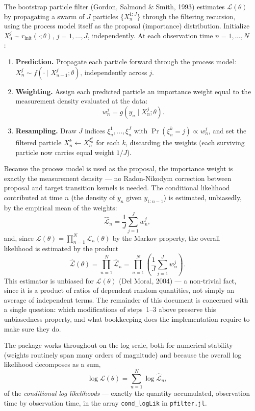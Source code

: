 \documentclass[11pt]{article}
\begin{document}
The bootstrap particle filter (Gordon, Salmond \& Smith, 1993) estimates
$\mathcal{L}(\theta)$ by propagating a swarm of $J$ particles
$\{X_n^{1:J}\}$ through the filtering recursion, using the process model itself
as the proposal (importance) distribution. Initialize
$X_0^{j} \sim r_{\mathrm{init}}(\cdot;\theta)$, $j=1,\dots,J$, independently.
At each observation time $n=1,\dots,N$:

\begin{enumerate}
\item \textbf{Prediction.} Propagate each particle forward through the process
model: $X_n^{j} \sim f(\cdot \mid X_{n-1}^{j};\theta)$, independently across $j$.
\item \textbf{Weighting.} Assign each predicted particle an importance weight
equal to the measurement density evaluated at the data:
\[
w_n^{j} = g(y_n \mid X_n^{j};\theta).
\]
\item \textbf{Resampling.} Draw $J$ indices $\xi_n^1,\dots,\xi_n^J$ with
$\Pr(\xi_n^k = j) \propto w_n^j$, and set the filtered particle
$X_n^{k} \leftarrow X_n^{\xi_n^k}$ for each $k$, discarding the weights (each
surviving particle now carries equal weight $1/J$).
\end{enumerate}

Because the process model is used as the proposal, the importance weight is
exactly the measurement density — no Radon-Nikodym correction between proposal
and target transition kernels is needed. The conditional likelihood contributed
at time $n$ (the density of $y_n$ given $y_{1:n-1}$) is estimated, unbiasedly,
by the empirical mean of the weights:
\[
\widehat{\mathcal{L}}_n = \frac{1}{J}\sum_{j=1}^J w_n^j,
\]
and, since $\mathcal{L}(\theta) = \prod_{n=1}^N \mathcal{L}_n(\theta)$ by the
Markov property, the overall likelihood is estimated by the product
\[
\widehat{\mathcal{L}}(\theta) = \prod_{n=1}^N \widehat{\mathcal{L}}_n
= \prod_{n=1}^N \left( \frac{1}{J}\sum_{j=1}^J w_n^j \right).
\]
This estimator is unbiased for $\mathcal{L}(\theta)$ (Del Moral, 2004) — a
non-trivial fact, since it is a product of ratios of dependent random
quantities, not simply an average of independent terms. The remainder of this
document is concerned with a single question: which modifications of steps~1–3
above preserve this unbiasedness property, and what bookkeeping does the
implementation require to make sure they do.

The package works throughout on the log scale, both for numerical stability
(weights routinely span many orders of magnitude) and because the overall log
likelihood decomposes as a sum,
\[
\log \widehat{\mathcal{L}}(\theta) = \sum_{n=1}^N \log \widehat{\mathcal{L}}_n,
\]
of the \emph{conditional log likelihoods} — exactly the quantity accumulated,
observation time by observation time, in the array \texttt{cond\_logLik} in
\texttt{pfilter.jl}.
\end{document}
